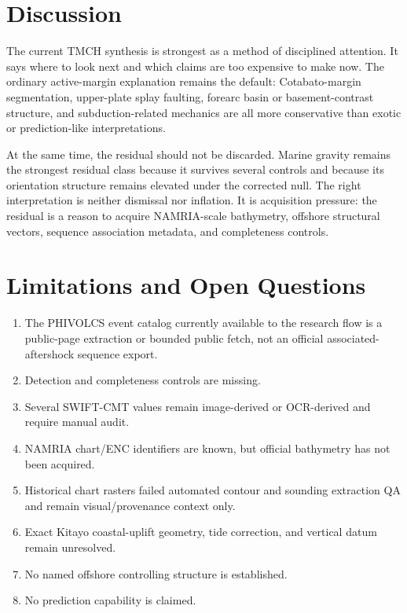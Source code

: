 \documentclass[11pt]{article}
\begin{document}
\section{Discussion}

The current TMCH synthesis is strongest as a method of disciplined attention. It says where to look next and which claims are too expensive to make now. The ordinary active-margin explanation remains the default: Cotabato-margin segmentation, upper-plate splay faulting, forearc basin or basement-contrast structure, and subduction-related mechanics are all more conservative than exotic or prediction-like interpretations.

At the same time, the residual should not be discarded. Marine gravity remains the strongest residual class because it survives several controls and because its orientation structure remains elevated under the corrected null. The right interpretation is neither dismissal nor inflation. It is acquisition pressure: the residual is a reason to acquire NAMRIA-scale bathymetry, offshore structural vectors, sequence association metadata, and completeness controls.

\section{Limitations and Open Questions}

\begin{enumerate}[leftmargin=2em]
  \item The PHIVOLCS event catalog currently available to the research flow is a public-page extraction or bounded public fetch, not an official associated-aftershock sequence export.
  \item Detection and completeness controls are missing.
  \item Several SWIFT-CMT values remain image-derived or OCR-derived and require manual audit.
  \item NAMRIA chart/ENC identifiers are known, but official bathymetry has not been acquired.
  \item Historical chart rasters failed automated contour and sounding extraction QA and remain visual/provenance context only.
  \item Exact Kitayo coastal-uplift geometry, tide correction, and vertical datum remain unresolved.
  \item No named offshore controlling structure is established.
  \item No prediction capability is claimed.
\end{enumerate}
\end{document}
